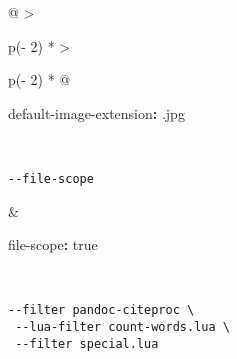\documentclass[
]{article}
\newenvironment{Shaded}{}{}
\newcommand{\AttributeTok}[1]{\textcolor[rgb]{0.49,0.56,0.16}{#1}}
\newcommand{\CharTok}[1]{\textcolor[rgb]{0.25,0.44,0.63}{#1}}
\newcommand{\FunctionTok}[1]{\textcolor[rgb]{0.02,0.16,0.49}{#1}}
\newcommand{\KeywordTok}[1]{\textcolor[rgb]{0.00,0.44,0.13}{\textbf{#1}}}
\newcommand{\StringTok}[1]{\textcolor[rgb]{0.25,0.44,0.63}{#1}}
\begin{document}
\begin{longtable}[]{@{}
  >{\raggedright\arraybackslash}p{(\columnwidth - 2\tabcolsep) * }
  >{\raggedright\arraybackslash}p{(\columnwidth - 2\tabcolsep) * }@{}}
\begin{minipage}[t]{\linewidth}
\begin{Shaded}
\begin{Highlighting}[]
\FunctionTok{default{-}image{-}extension}\KeywordTok{:}\AttributeTok{ }\StringTok{\textquotesingle{}.jpg\textquotesingle{}}
\end{Highlighting}
\end{Shaded}
\end{minipage} \\
\begin{minipage}[t]{\linewidth}\raggedright
\begin{verbatim}
--file-scope
\end{verbatim}
\end{minipage} & \begin{minipage}[t]{\linewidth}\raggedright
\begin{Shaded}
\begin{Highlighting}[]
\FunctionTok{file{-}scope}\KeywordTok{:}\AttributeTok{ }\CharTok{true}
\end{Highlighting}
\end{Shaded}
\end{minipage} \\
\begin{minipage}[t]{\linewidth}\raggedright
\begin{verbatim}
--filter pandoc-citeproc \
 --lua-filter count-words.lua \
 --filter special.lua


\end{verbatim}
\end{minipage}
\end{longtable}
\end{document}
